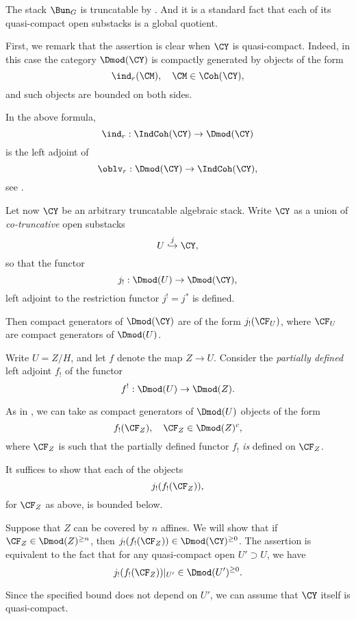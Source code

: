 \documentclass[9pt]{amsart}
\theoremstyle{remark}
\theoremstyle{definition}
\theoremstyle{remark}
\numberwithin{equation}{section}
\begin{document}
\medskip

The stack $\Bun_G$ is truncatable by \cite[Theorem 0.2.5]{DG1}. And it is a standard fact that each of its
quasi-compact open substacks is a global quotient. 

\sssec{}

First, we remark that the assertion is clear when $\CY$ is quasi-compact. Indeed, in this case
the category $\Dmod(\CY)$ is compactly generated by objects of the form
$$\ind_r(\CM), \quad \CM\in \Coh(\CY),$$
and such objects are bounded on both sides.

\medskip

In the above formula, 
$$\ind_r: \IndCoh(\CY)\to \Dmod(\CY)$$
is the left adjoint of 
$$\oblv_r:\Dmod(\CY)\to \IndCoh(\CY),$$
see \cite[Sect. 5.1.5]{DG2}.

\sssec{}

Let now $\CY$ be an arbitrary truncatable algebraic stack. Write $\CY$ as a union of \emph{co-truncative}
open substacks 
$$U\overset{j}\hookrightarrow \CY,$$
so that the functor 
$$j_!:\Dmod(U)\to \Dmod(\CY),$$
left adjoint to the restriction functor $j^!=j^*$ is defined. 

\medskip

Then compact generators of $\Dmod(\CY)$ are of the form
$j_!(\CF_U)$, where $\CF_U$ are compact generators of $\Dmod(U)$.

\sssec{}

Write $U=Z/H$, and let $f$ denote the map $Z\to U$. Consider the \emph{partially defined} 
left adjoint $f_!$ of the functor
$$f^!:\Dmod(U)\to \Dmod(Z).$$

As in \cite[Sect. F.3.5]{AGKRRV}, we can take as compact generators of $\Dmod(U)$ objects of the form
$$f_!(\CF_Z), \quad \CF_Z\in \Dmod(Z)^c,$$
where $\CF_Z$ is such that the partially defined functor $f_!$ \emph{is} defined on 
$\CF_Z$.

\medskip

It suffices to show that each of the objects 
$$j_!(f_!(\CF_Z)),$$
for $\CF_Z$ as above, is bounded below. 

\medskip

Suppose that $Z$ can be covered by $n$ affines. We will show that if $\CF_Z\in \Dmod(Z)^{\geq n}$, then $j_!(f_!(\CF_Z))\in \Dmod(\CY)^{\geq 0}$. 
The assertion is equivalent to the fact that for any quasi-compact open $U'\supset U$, we have
$$j_!(f_!(\CF_Z))|_{U'}\in  \Dmod(U')^{\geq 0}.$$

Since the specified bound does not depend on $U'$, we can assume that $\CY$ itself is quasi-compact. 
\end{document}
